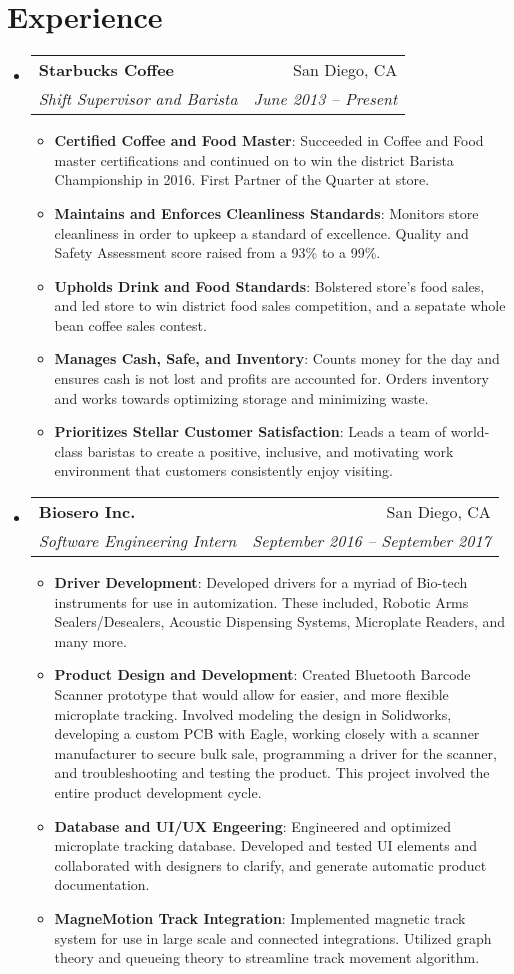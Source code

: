 \documentclass[letterpaper,11pt]{article}
\makeatletter
\newcommand{\resumeItem}[2]{
  \item\small{
    \textbf{#1}{: #2 \vspace{-2pt}}
  }
}
\newcommand{\resumeSubheading}[4]{
  \vspace{-1pt}\item
    \begin{tabular*}{0.97\textwidth}[t]{l@{\extracolsep{\fill}}r}
      \textbf{#1} & #2 \\
      \textit{\small#3} & \textit{\small #4} \\
    \end{tabular*}\vspace{-5pt}
}
\newcommand{\resumeSubHeadingListStart}{\begin{itemize}[leftmargin=*]}
\newcommand{\resumeSubHeadingListEnd}{\end{itemize}}
\newcommand{\resumeItemListStart}{\begin{itemize}}
\newcommand{\resumeItemListEnd}{\end{itemize}\vspace{-5pt}}
\makeatother
\begin{document}
\section{Experience}
  \resumeSubHeadingListStart
    \resumeSubheading
      {Starbucks Coffee}{San Diego, CA}
      {Shift Supervisor and Barista}{June 2013 -- Present}
      \resumeItemListStart
        \resumeItem{Certified Coffee and Food Master}
          {Succeeded in Coffee and Food master certifications and continued on to win the district Barista Championship in 2016. First Partner of the Quarter at store.}
        \resumeItem{Maintains and Enforces Cleanliness Standards}
          {Monitors store cleanliness in order to upkeep a standard of excellence. Quality and Safety Assessment score raised from a 93\% to a 99\%.}
        \resumeItem{Upholds Drink and Food Standards}
          {Bolstered store's food sales, and led store to win district food sales competition, and a sepatate whole bean coffee sales contest. }
        \resumeItem{Manages Cash, Safe, and Inventory}
          {Counts money for the day and ensures cash is not lost and profits are accounted for. Orders inventory and works towards optimizing storage and minimizing waste.}
          \resumeItem{Prioritizes Stellar Customer Satisfaction}
            {Leads a team of world-class baristas to create a positive, inclusive, and motivating work environment that customers consistently enjoy visiting.}
      \resumeItemListEnd
      \resumeSubheading
        {Biosero Inc.}{San Diego, CA}
        {Software Engineering Intern}{September 2016 -- September 2017}
        \resumeItemListStart
        \resumeItem{Driver Development}
          {Developed drivers for a myriad of Bio-tech instruments for use in automization. These included, Robotic Arms Sealers/Desealers, Acoustic Dispensing Systems, Microplate Readers, and many more.}
        \resumeItem{Product Design and Development}
          {Created Bluetooth Barcode Scanner prototype that would allow for easier, and more flexible microplate tracking. Involved
          modeling the design in Solidworks, developing a custom PCB with Eagle, working closely with a scanner manufacturer to secure bulk sale,
          programming a driver for the scanner, and troubleshooting and testing the product. This project involved the entire product development cycle.}
        \resumeItem{Database and UI/UX Engeering}
          {Engineered and optimized microplate tracking database.
          Developed and tested UI elements and collaborated with designers to clarify, and generate automatic product documentation.}
        \resumeItem{MagneMotion Track Integration}
        {Implemented magnetic track system for use in large scale and connected integrations. Utilized graph theory and queueing theory to streamline track movement algorithm. }
        \resumeItemListEnd
  \resumeSubHeadingListEnd
\end{document}
